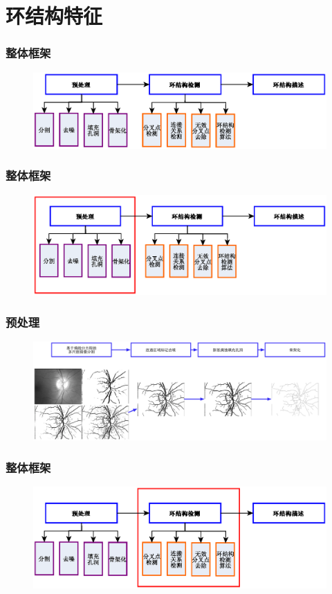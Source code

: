 \documentclass[notheorems,mathserif,table,compress]{beamer}  %
\begin{document}
\section{环结构特征}
\begin{frame}
\frametitle{整体框架}
\begin{figure}
\centering
    \centering
    \includegraphics[width=12cm]{chap02/cycle-framework}\medskip
\end{figure}
\end{frame}

\begin{frame}
\frametitle{整体框架}
\begin{figure}
\centering
    \centering
    \includegraphics[width=12cm]{chap02/cycle-framework1}\medskip
\end{figure}
\end{frame}

\begin{frame}
\frametitle{预处理}
\begin{figure}
\centering
    \centering
    \includegraphics[width=12.5cm]{chap02/processing}\medskip
\end{figure}
\end{frame}

\begin{frame}
\frametitle{整体框架}
\begin{figure}
    \centering
    \includegraphics[width=12cm]{chap02/cycle-framework2}\medskip
\end{figure}
\end{frame}
\end{document}
